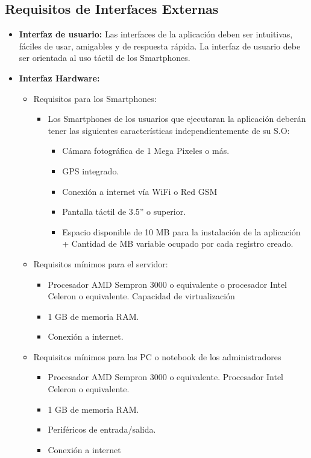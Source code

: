     \subsection{Requisitos de Interfaces Externas}
      \begin{itemize}
        \item \textbf{Interfaz de usuario:} Las interfaces de la aplicación deben ser intuitivas, fáciles de usar, amigables y de respuesta rápida. La interfaz de usuario debe ser orientada al uso táctil de los Smartphones.
        \item \textbf{Interfaz Hardware:} 
          \begin{itemize}
            \item Requisitos para los Smartphones:
              \begin{itemize}
                \item Los Smartphones de los usuarios que ejecutaran la aplicación deberán tener las siguientes características independientemente de su S.O:
                  \begin{itemize}
                    \item Cámara fotográfica de 1 Mega Pixeles o más.
                    \item GPS integrado.
                    \item Conexión a internet vía WiFi o Red GSM
                    \item Pantalla táctil de 3.5'' o superior.
                    \item Espacio disponible de 10 MB para la instalación de la aplicación + Cantidad de MB variable ocupado por cada registro creado. 
                  \end{itemize}
              \end{itemize}
            \item Requisitos mínimos para el servidor:
            \begin{itemize}
              \item Procesador AMD Sempron 3000 o equivalente o procesador Intel Celeron o equivalente. Capacidad de virtualización
              \item 1 GB de memoria RAM.
              \item Conexión a internet.
            \end{itemize}
            \item Requisitos mínimos para las PC o notebook de los administradores
            \begin{itemize}
              \item Procesador AMD Sempron 3000 o equivalente. Procesador Intel Celeron o equivalente.
              \item 1 GB de memoria RAM.
              \item Periféricos de entrada/salida.
              \item Conexión a internet
            \end{itemize}
          \end{itemize}
      

\end{itemize}
